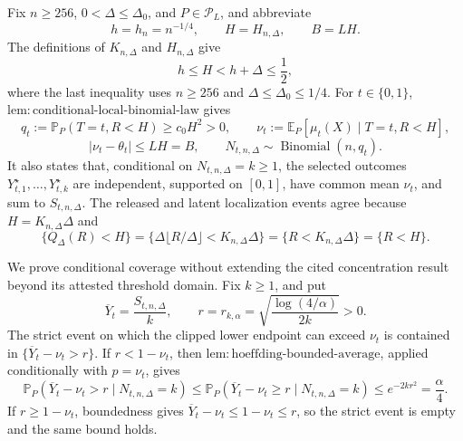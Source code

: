 Fix \(n\geq256\), \(0<\Delta\leq\Delta_0\), and \(P\in\mathcal P_L\), and abbreviate
\[
 h=h_n=n^{-1/4},\qquad H=H_{n,\Delta},\qquad B=LH.
\]
The definitions of \(K_{n,\Delta}\) and \(H_{n,\Delta}\) give
\[
 h\leq H<h+\Delta\leq\frac12,
\]
where the last inequality uses \(n\geq256\) and \(\Delta\leq\Delta_0\leq1/4\).  For \(t\in\{0,1\}\), \(\mathrm{lem:conditional\text{-}local\text{-}binomial\text{-}law}\) gives
\[
 q_t:=\mathbb P_P(T=t,R<H)\geq c_0H^2>0,
 \qquad
 \nu_t:=\mathbb E_P[\mu_t(X)\mid T=t,R<H],
\]
\[
 |\nu_t-\theta_t|\leq LH=B,
 \qquad
 N_{t,n,\Delta}\sim\operatorname{Binomial}(n,q_t).
\]
It also states that, conditional on \(N_{t,n,\Delta}=k\geq1\), the selected outcomes \(Y_{t,1}^{\star},\ldots,Y_{t,k}^{\star}\) are independent, supported on \([0,1]\), have common mean \(\nu_t\), and sum to \(S_{t,n,\Delta}\).  The released and latent localization events agree because \(H=K_{n,\Delta}\Delta\) and
\[
 \{Q_\Delta(R)<H\}
 =\{\Delta\lfloor R/\Delta\rfloor<K_{n,\Delta}\Delta\}
 =\{R<K_{n,\Delta}\Delta\}
 =\{R<H\}.
\]

We prove conditional coverage without extending the cited concentration result beyond its attested threshold domain.  Fix \(k\geq1\), and put
\[
 \overline Y_t=\frac{S_{t,n,\Delta}}k,
 \qquad
 r=r_{k,\alpha}=\sqrt{\frac{\log(4/\alpha)}{2k}}>0.
\]
The strict event on which the clipped lower endpoint can exceed \(\nu_t\) is contained in \(\{\overline Y_t-\nu_t>r\}\).  If \(r<1-\nu_t\), then \(\mathrm{lem:hoeffding\text{-}bounded\text{-}average}\), applied conditionally with \(p=\nu_t\), gives
\[
 \mathbb P_P(\overline Y_t-\nu_t>r\mid N_{t,n,\Delta}=k)
 \leq\mathbb P_P(\overline Y_t-\nu_t\geq r\mid N_{t,n,\Delta}=k)
 \leq e^{-2kr^2}=\frac\alpha4.
\]
If \(r\geq1-\nu_t\), boundedness gives \(\overline Y_t-\nu_t\leq1-\nu_t\leq r\), so the strict event is empty and the same bound holds.

